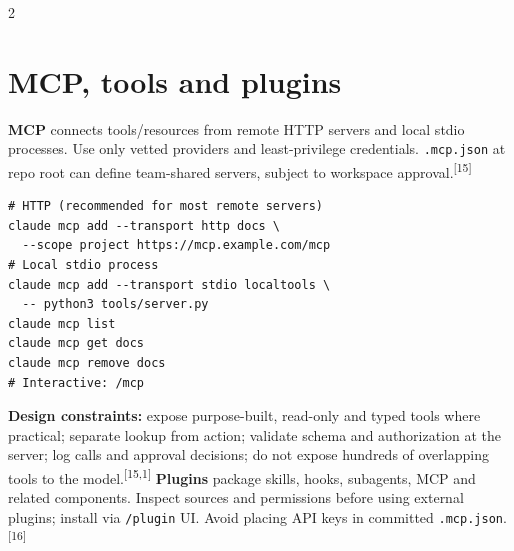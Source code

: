 \documentclass[9pt,a4paper]{extarticle}
\newcommand{\kw}[1]{\textbf{\color{navy}#1}}
\newcommand{\cmd}[1]{{\footnotesize\color{navy}\texttt{#1}}}
\newcommand{\src}[1]{\textsuperscript{\color{blue}[#1]}}
\begin{document}
\begin{multicols}{2}
\section{MCP, tools and plugins}
\kw{MCP} connects tools/resources from remote HTTP servers and local stdio processes. Use only vetted providers and least-privilege credentials. \cmd{.mcp.json} at repo root can define team-shared servers, subject to workspace approval.\src{15}
\begin{lstlisting}
# HTTP (recommended for most remote servers)
claude mcp add --transport http docs \
  --scope project https://mcp.example.com/mcp
# Local stdio process
claude mcp add --transport stdio localtools \
  -- python3 tools/server.py
claude mcp list
claude mcp get docs
claude mcp remove docs
# Interactive: /mcp
\end{lstlisting}
\kw{Design constraints:} expose purpose-built, read-only and typed tools where practical; separate lookup from action; validate schema and authorization at the server; log calls and approval decisions; do not expose hundreds of overlapping tools to the model.\src{15,1}
\kw{Plugins} package skills, hooks, subagents, MCP and related components. Inspect sources and permissions before using external plugins; install via \cmd{/plugin} UI. Avoid placing API keys in committed \cmd{.mcp.json}.\src{16}


\end{multicols}
\end{document}
